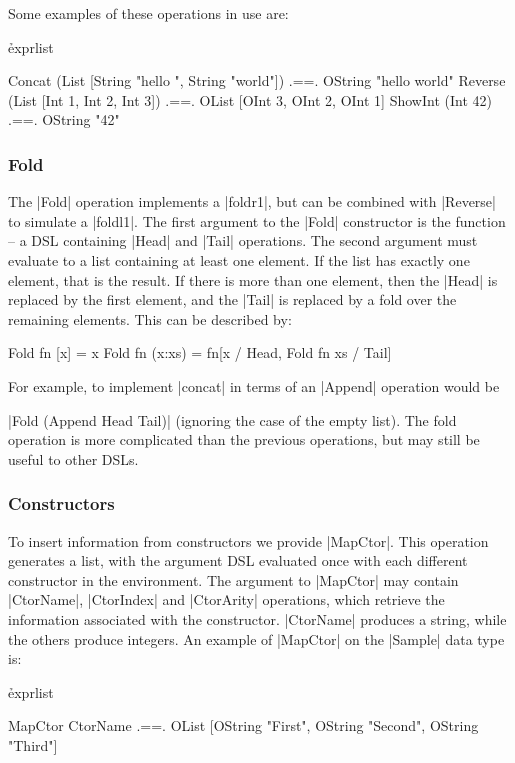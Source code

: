 \documentclass[preprint,draft]{sigplanconf}
\begin{document}
Some examples of these operations in use are:

\h{exprlist}\begin{code}
Concat (List [String "hello ", String "world"])
    .==. OString "hello world"
Reverse (List [Int 1, Int 2, Int 3])
    .==. OList [OInt 3, OInt 2, OInt 1]
ShowInt (Int 42) .==. OString "42"
\end{code}

\subsubsection{Fold}

The |Fold| operation implements a |foldr1|, but can be combined with |Reverse| to simulate a |foldl1|. The first argument to the |Fold| constructor is the function -- a DSL containing |Head| and |Tail| operations. The second argument must evaluate to a list containing at least one element. If the list has exactly one element, that is the result. If there is more than one element, then the |Head| is replaced by the first element, and the |Tail| is replaced by a fold over the remaining elements. This can be described by:

\ignore\begin{code}
Fold fn [x] = x
Fold fn (x:xs) = fn[x / Head, Fold fn xs / Tail]
\end{code}

For example, to implement |concat| in terms of an |Append| operation would be \ignore|Fold (Append Head Tail)| (ignoring the case of the empty list). The fold operation is more complicated than the previous operations, but may still be useful to other DSLs.

\subsubsection{Constructors}

To insert information from constructors we provide |MapCtor|. This operation generates a list, with the argument DSL evaluated once with each different constructor in the environment. The argument to |MapCtor| may contain |CtorName|, |CtorIndex| and |CtorArity| operations, which retrieve the information associated with the constructor. |CtorName| produces a string, while the others produce integers. An example of |MapCtor| on the |Sample| data type is:

\h{exprlist}\begin{code}
MapCtor CtorName .==. OList
    [OString "First", OString "Second", OString "Third"]
\end{code}
\end{document}
